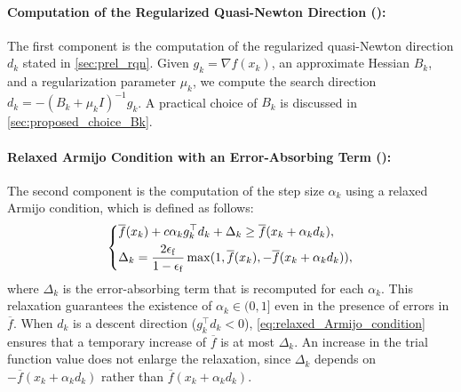 \documentclass[journal_revised_MPC]{subfiles}
\begin{document}
\paragraph{Computation of the Regularized Quasi-Newton Direction (): }\label{sec:algorithm_components_d}

The first component is the computation of the regularized quasi-Newton direction $d_k$ stated in \cref{sec:prel_rqn}.
Given $g_k=\nabla f(x_k)$, an approximate Hessian $B_k$, and a regularization parameter $\mu_k$, we compute the search direction $d_k = -(B_k+\mu_k I)^{-1} g_k$.
A practical choice of $B_k$ is discussed in \cref{sec:proposed_choice_Bk}.

\paragraph{Relaxed Armijo Condition with an Error-Absorbing Term (): }\label{sec:algorithm_components_alpha}

The second component is the computation of the step size $\alpha_k$ using a relaxed Armijo condition, which is defined as follows:
\begin{equation}\label{eq:relaxed_Armijo_condition}
    \begin{dcases}
        \overline{f}(x_k)+c\alpha_k g_k^\top d_k+\Delta_k\ge\overline{f}(x_k+\alpha_k d_k), \\
        \Delta_k = \frac{2\epsilon_\mathrm{f}}{1-\epsilon_\mathrm{f}} \max(1, \overline{f}(x_k), -\overline{f}(x_k + \alpha_k d_k)),
    \end{dcases}
\end{equation}
where $\Delta_k$ is the error-absorbing term that is recomputed for each $\alpha_k$.
This relaxation guarantees the existence of $\alpha_k \in (0,1]$ even in the presence of errors in $\overline{f}$.
When $d_k$ is a descent direction ($g_k^\top d_k < 0$), \cref{eq:relaxed_Armijo_condition} ensures that a temporary increase of $\overline{f}$ is at most $\Delta_k$.
An increase in the trial function value does not enlarge the relaxation, since $\Delta_k$ depends on $-\overline{f}(x_k + \alpha_k d_k)$ rather than $\overline{f}(x_k + \alpha_k d_k)$.
\end{document}
